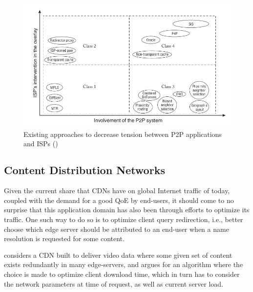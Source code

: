     \begin{figure}[!h]
    \centering
    \includegraphics[scale=0.65]{img/approaches-isp-p2p.png}
    \caption{Existing approaches to decrease tension between P2P applications and ISPs (\cite{dan-Commag10})}
    \label{fig:p2p-isp-interactions}
    \end{figure}

    \subsection{Content Distribution Networks}

        Given the current share that CDNs have on global Internet traffic of today, coupled with the demand for a good QoE by end-users, it should come to no surprise that this application domain has also been through efforts to optimize its traffic.
        One such way to do so is to optimize client query redirection, i.e., better choose which edge server should be attributed to an end-user when a name resolution is requested for some content.

        \cite{gromov2014} considers a CDN built to deliver video data where some given set of content exists redundantly in many edge-servers, and argues for an algorithm where the choice is made to optimize client download time, which in turn has to consider the network parameters at time of request, as well as current server load.

